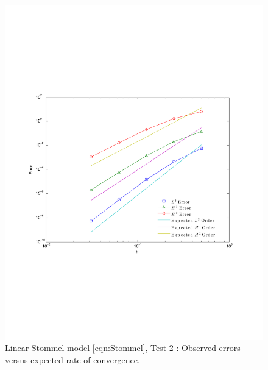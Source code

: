 \begin{figure}
  \begin{center}
    \includegraphics[scale=0.5]{Figures/StommelMyersConvergence.pdf}
    \caption{Linear Stommel model \eqref{eqn:Stommel}, Test 2 \cite{Myers}:
      Observed errors versus expected rate of convergence.}
    \label{fig:StommelErrorsMeyers}
  \end{center}
\end{figure}

